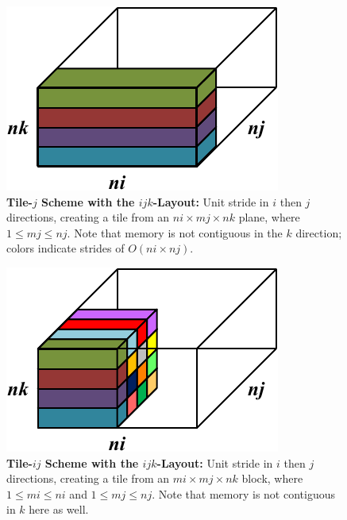 \documentclass{sig-alternate-05-2015}
\begin{document}
\begin{figure}[!bt]
  \centering
  \caption{
    \textbf{Tile-\(j\) Scheme with the \(ijk\)-Layout:} 
    Unit stride in \(i\) then \(j\) directions, creating a tile from an 
    \(ni \times mj \times nk \) plane, where \(1 \le  mj \le nj \).
    Note that memory is not contiguous in the \(k\) direction; 
    colors indicate strides of $O(ni \times nj)$.
  }
  \label{fig:implementation:tiling:ijk_layout_tile_j}
  \includegraphics[width=0.70\columnwidth]{figures/ijk_layout_tile_j_scheme.pdf}
  \vspace{-.5cm}
\end{figure}

\begin{figure}[!bt]
  \centering
  \caption{
    \textbf{Tile-\(ij\) Scheme with the \(ijk\)-Layout:} 
    Unit stride in \(i\) then \(j\) directions, creating a tile from an 
    \(mi \times mj \times nk \) block, 
    where \(1 \le  mi \le ni \) and \(1 \le  mj \le nj \).
    Note that memory is not contiguous in \(k\) here as well.
  }
  \label{fig:implementation:tiling:ijk_layout_tile_ij}
  \includegraphics[width=0.70\columnwidth]{figures/ijk_layout_tile_ij_scheme.pdf}
  \vspace{-.5cm}
\end{figure}
\end{document}
